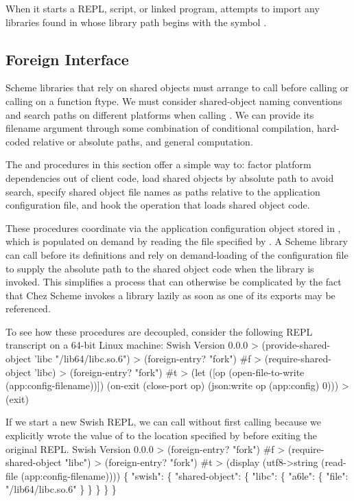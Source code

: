 When it starts a REPL, script, or linked program,  attempts
to import any libraries found in  whose library path begins
with the symbol .

\subsection{Foreign Interface}

Scheme libraries that rely on shared objects must arrange
to call  before calling  or
calling  on a function ftype.
We must consider shared-object naming conventions and search paths on
different platforms when calling .
We can provide its filename argument through some combination of conditional
compilation, hard-coded relative or absolute paths, and general computation.

The  and  procedures
in this section offer a simple way to:
factor platform dependencies out of client code,
load shared objects by absolute path to avoid search,
specify shared object file names as paths relative
to the application configuration file, and
hook the operation that loads shared object code.

These procedures coordinate via the application configuration object stored in
, which is populated on demand by reading the file specified
by .
A Scheme library can call  before its
 definitions and rely on demand-loading of the
configuration file to supply the absolute path to the shared object code when
the library is invoked.
This simplifies a process that can otherwise be complicated
by the fact that Chez Scheme invokes a library lazily as soon as
one of its exports may be referenced.

To see how these procedures are decoupled, consider the following REPL
transcript on a 64-bit Linux machine:
\codebegin
Swish Version 0.0.0
> (provide-shared-object 'libc "/lib64/libc.so.6")
> (foreign-entry? "fork")
#f
> (require-shared-object 'libc)
> (foreign-entry? "fork")
#t
> (let ([op (open-file-to-write (app:config-filename))])
    (on-exit (close-port op)
      (json:write op (app:config) 0)))
> (exit)
\codeend

If we start a new Swish REPL, we can call 
without first calling 
because we explicitly wrote the value of  to the location
specified by  before exiting the original REPL.
\codebegin
Swish Version 0.0.0
> (foreign-entry? "fork")
#f
> (require-shared-object "libc")
> (foreign-entry? "fork")
#t
> (display (utf8->string (read-file (app:config-filename))))
\{
  "swish": \{
    "shared-object": \{
      "libc": \{
        "a6le": \{
          "file": "/lib64/libc.so.6"
        \}
      \}
    \}
  \}
\}
\codeend

